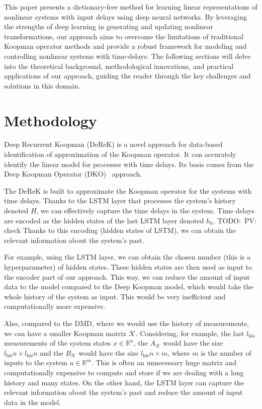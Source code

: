 \documentclass[conference]{IEEEtran}
\newcommand{\ui}[2]{#1_{\text{#2}}}
\newcommand{\todo}[1]{{{\color{red} TODO:~#1	}} }
\begin{document}
This paper presents a dictionary-free method for learning linear representations of nonlinear systems with input delays using deep neural networks. By leveraging the strengths of deep learning in generating and updating nonlinear transformations, our approach aims to overcome the limitations of traditional Koopman operator methods and provide a robust framework for modeling and controlling nonlinear systems with time-delays. The following sections will delve into the theoretical background, methodological innovations, and practical applications of our approach, guiding the reader through the key challenges and solutions in this domain.

\section{Methodology}



Deep Recurrent Koopman (DeReK) is a novel approach for data-based identification of approximation of the Koopman operator. It can accurately identify the linear model for processes with time delays. Its basis comes from the Deep Koopman Operator (DKO)~\cite{lusch2018deep} approach.

The DeReK is built to approximate the Koopman operator for the systems with time delays. Thanks to the LSTM layer that processes the system's history denoted \(H\), we can effectively capture the time delays in the system. Time delays are encoded as the hidden states of the last LSTM layer denoted \(h_k\). \todo{PV: check} Thanks to this encoding (hidden states of LSTM), we can obtain the relevant information about the system's past.

For example, using the LSTM layer, we can obtain the chosen number (this is a hyperparameter) of hidden states. These hidden states are then used as input to the encoder part of our approach. This way, we can reduce the amount of input data to the model compared to the Deep Koopman model, which would take the whole history of the system as input. This would be very inefficient and computationally more expensive.

Also, compared to the DMD, where we would use the history of measurements, we can have a smaller Koopman matrix \(\mathcal{K}\). Considering, for example, the last \(\ui{l}{his}\) measurements of the system states \(x \in \mathbb{R}^n\), the \(A_\mathcal{K}\) would have the size \(\ui{l}{his}n \times \ui{l}{his}n\) and the \(B_\mathcal{K}\) would have the size \(\ui{l}{his}n \times m\),  where \(m\) is the number of inputs to the system \(u \in \mathbb{R}^m\). This is often an unnecessary huge matrix and computationally expensive to compute and store if we are dealing with a long history and many states. On the other hand, the LSTM layer can capture the relevant information about the system's past and reduce the amount of input data in the model.
\end{document}
